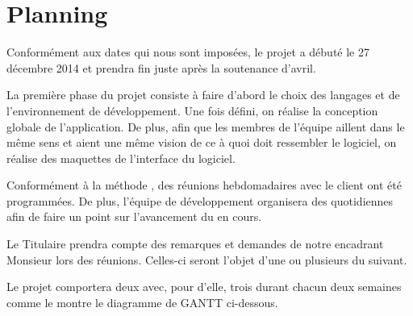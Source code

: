 \chapter{Planning}
Conformément aux dates qui nous sont imposées, le projet a débuté le 27 décembre 2014 et prendra fin juste après la soutenance d'avril.

La première phase du projet consiste à faire d'abord le choix des langages et de l'environnement de développement. Une fois défini, on réalise la conception globale de l'application. De plus, afin que les membres de l'équipe aillent dans le même sens et aient une même vision de ce à quoi doit ressembler le logiciel, on réalise des maquettes de l'interface du logiciel. 

Conformément à la méthode , des réunions hebdomadaires avec le client ont été programmées. De plus, l'équipe de développement organisera des  quotidiennes afin de faire un point sur l'avancement du  en cours. 

Le Titulaire prendra compte des remarques et demandes de notre encadrant Monsieur  lors des réunions. Celles-ci seront l'objet d'une ou plusieurs  du  suivant. 

Le projet comportera deux  avec, pour d'elle, trois  durant chacun deux semaines comme le montre le diagramme de GANTT ci-dessous.

